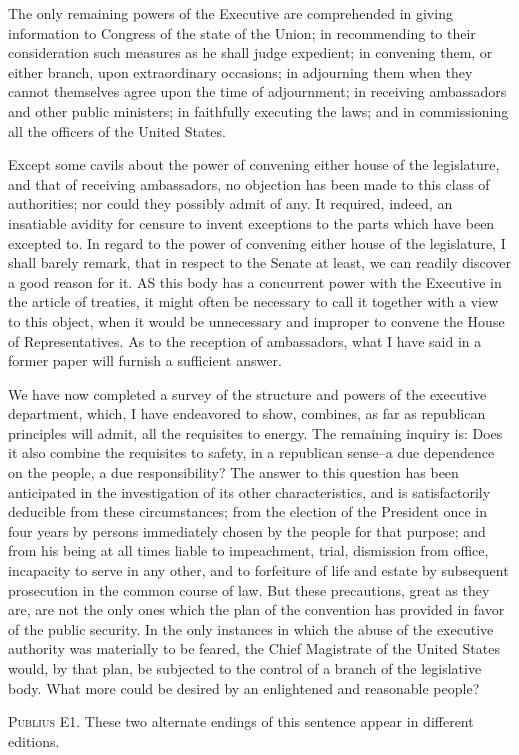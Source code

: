 The only remaining powers of the Executive are comprehended in giving information to Congress of the state of the Union; in recommending to their consideration such measures as he shall judge expedient; in convening them, or either branch, upon extraordinary occasions; in adjourning them when they cannot themselves agree upon the time of adjournment; in receiving ambassadors and other public ministers; in faithfully executing the laws; and in commissioning all the officers of the United States.

Except some cavils about the power of convening either house of the legislature, and that of receiving ambassadors, no objection has been made to this class of authorities; nor could they possibly admit of any. It required, indeed, an insatiable avidity for censure to invent exceptions to the parts which have been excepted to. In regard to the power of convening either house of the legislature, I shall barely remark, that in respect to the Senate at least, we can readily discover a good reason for it. AS this body has a concurrent power with the Executive in the article of treaties, it might often be necessary to call it together with a view to this object, when it would be unnecessary and improper to convene the House of Representatives. As to the reception of ambassadors, what I have said in a former paper will furnish a sufficient answer.

We have now completed a survey of the structure and powers of the executive department, which, I have endeavored to show, combines, as far as republican principles will admit, all the requisites to energy. The remaining inquiry is: Does it also combine the requisites to safety, in a republican sense--a due dependence on the people, a due responsibility? The answer to this question has been anticipated in the investigation of its other characteristics, and is satisfactorily deducible from these circumstances; from the election of the President once in four years by persons immediately chosen by the people for that purpose; and from his being at all times liable to impeachment, trial, dismission from office, incapacity to serve in any other, and to forfeiture of life and estate by subsequent prosecution in the common course of law. But these precautions, great as they are, are not the only ones which the plan of the convention has provided in favor of the public security. In the only instances in which the abuse of the executive authority was materially to be feared, the Chief Magistrate of the United States would, by that plan, be subjected to the control of a branch of the legislative body. What more could be desired by an enlightened and reasonable people?

\vspace{.5cm}
\textsc{Publius}
E1. These two alternate endings of this sentence appear in different editions.

